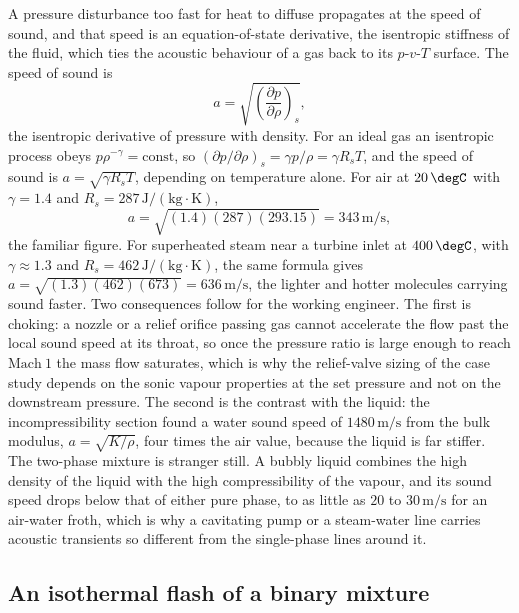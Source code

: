 A pressure disturbance too fast for heat to diffuse propagates at the speed
of sound, and that speed is an equation-of-state derivative, the isentropic
stiffness of the fluid, which ties the acoustic behaviour of a gas back to
its $p$-$v$-$T$ surface. The speed of sound is
\[
a = \sqrt{\left(\frac{\partial p}{\partial \rho}\right)_s},
\]
the isentropic derivative of pressure with density. For an ideal gas an
isentropic process obeys $p\rho^{-\gamma} = \text{const}$, so $(\partial
p/\partial \rho)_s = \gamma p/\rho = \gamma R_s T$, and the speed of sound
is $a = \sqrt{\gamma R_s T}$, depending on temperature alone. For air at
$20\,\degC$ with $\gamma = 1.4$ and $R_s = 287\,\text{J}/(\text{kg}\cdot
\si{\kelvin})$,
\[
a = \sqrt{(1.4)(287)(293.15)} = 343\,\text{m}/\text{s},
\]
the familiar figure. For superheated steam near a turbine inlet at
$400\,\degC$, with $\gamma \approx 1.3$ and $R_s = 462\,\text{J}/(\text{kg}
\cdot\si{\kelvin})$, the same formula gives $a = \sqrt{(1.3)(462)(673)} =
636\,\text{m}/\text{s}$, the lighter and hotter molecules carrying sound
faster. Two consequences follow for the working engineer. The first is
choking: a nozzle or a relief orifice passing gas cannot accelerate the flow
past the local sound speed at its throat, so once the pressure ratio is
large enough to reach $\text{Mach}\ 1$ the mass flow saturates, which is why
the relief-valve sizing of the case study depends on the sonic vapour
properties at the set pressure and not on the downstream pressure. The
second is the contrast with the liquid: the incompressibility section found
a water sound speed of $1480\,\text{m}/\text{s}$ from the bulk modulus,
$a = \sqrt{K/\rho}$, four times the air value, because the liquid is far
stiffer. The two-phase mixture is stranger still. A bubbly liquid combines
the high density of the liquid with the high compressibility of the vapour,
and its sound speed drops below that of either pure phase, to as little as
$20$ to $30\,\text{m}/\text{s}$ for an air-water froth, which is why a
cavitating pump or a steam-water line carries acoustic transients so
different from the single-phase lines around it.

\subsection{An isothermal flash of a binary mixture}

